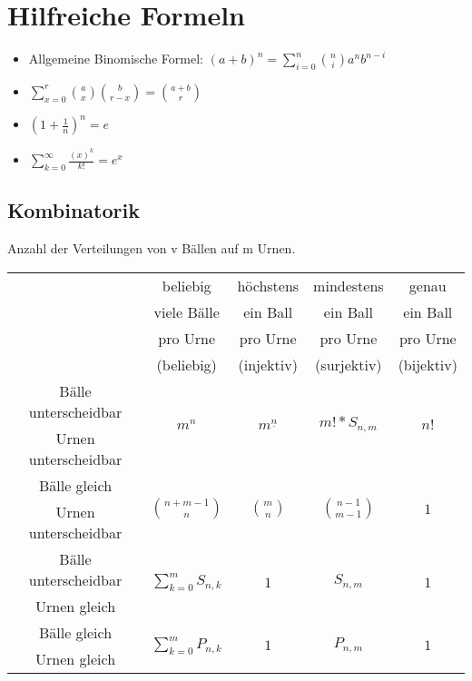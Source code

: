 \section{Hilfreiche Formeln}

\begin{itemize}
\item Allgemeine Binomische Formel: $(a+b)^n=\sum^n_{i=0}\binom {n}{i}a^nb^{n-i}$
\item $\sum^r_{x=0}\binom{a}{x}\binom{b}{r-x}=\binom{a+b}{r}$
\item $\left(1+\frac{1}{n}\right)^n=e$
\item $\sum_{k=0}^\infty\frac{(x)^k}{k!}=e^x$
\end{itemize}

\subsection{Kombinatorik}
Anzahl der Verteilungen von v Bällen auf m Urnen.\\
\begin{tabular}{|c||c|c|c|c|}
\hline
&beliebig &höchstens &mindestens&genau\\
&viele Bälle&ein Ball& ein Ball& ein Ball\\
& pro Urne& pro Urne& pro Urne& pro Urne\\
& (beliebig)& (injektiv) & (surjektiv)& (bijektiv)\\
\hline
\hline
Bälle unterscheidbar& \multirow{2}{*}{$m^n$} &\multirow{2}{*}{$m^\underline{n}$} &\multirow{2}{*}{$m!*S_{n,m}$} &\multirow{2}{*}{$n!$}\\
Urnen unterscheidbar &&&&\\
\hline
Bälle gleich& \multirow{2}{*}{$\binom{n+m-1}{n}$} &\multirow{2}{*}{$\binom{m}{n}$} &\multirow{2}{*}{$\binom{n-1}{m-1}$} &\multirow{2}{*}{$1$}\\
Urnen unterscheidbar &&&&\\
\hline
Bälle unterscheidbar& \multirow{2}{*}{$\sum^m_{k=0}S_{n,k}$} &\multirow{2}{*}{$1$} &\multirow{2}{*}{$S_{n,m}$} &\multirow{2}{*}{$1$}\\
Urnen gleich &&&&\\
\hline
Bälle gleich& \multirow{2}{*}{$\sum^m_{k=0}P_{n,k}$} &\multirow{2}{*}{$1$} &\multirow{2}{*}{$P_{n,m}$} &\multirow{2}{*}{$1$}\\
Urnen gleich &&&&\\
\hline
\end{tabular}
